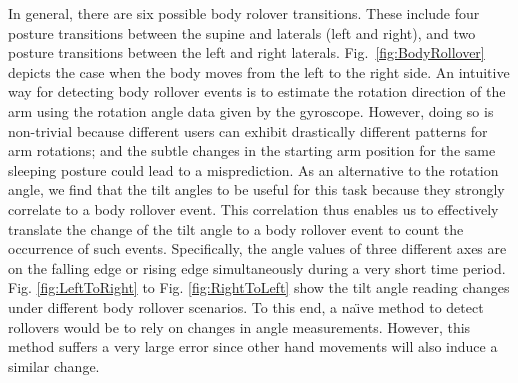 In general, there are six possible body rolover transitions. These include four posture transitions between the supine and laterals (left
and right), and two posture transitions between the left and right laterals. Fig.~\ref{fig:BodyRollover} depicts the case when the body
moves from the left to the right side. An intuitive way for detecting body rollover events is to estimate the rotation direction of the arm
using the rotation angle data given by the gyroscope. However, doing so is non-trivial because different users can exhibit drastically
different patterns for arm rotations; and the subtle changes in the starting arm position for the same sleeping posture could lead to a
misprediction. As an alternative to the rotation angle, we find that the tilt angles to be useful for this task because they strongly
correlate to a body rollover event. This correlation thus enables us to effectively translate the change of the tilt angle to a body
rollover event to count the occurrence of such events. Specifically, the angle values of three different axes are on the falling edge or
rising edge simultaneously during a very short time period. Fig. \ref{fig:LeftToRight} to Fig. \ref{fig:RightToLeft} show the tilt angle
reading changes under different body rollover scenarios. To this end, a na\"{\i}ve method to detect rollovers would be to rely on changes
in angle measurements. However, this method suffers a very large error since other hand movements will also induce a similar change.

